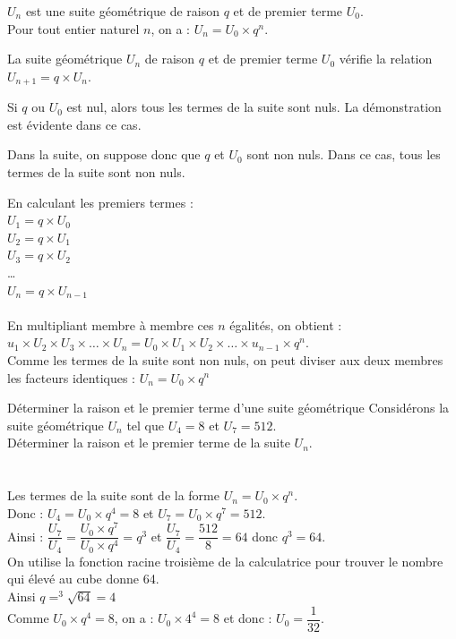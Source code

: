 \begin{propriete}
    $U_n$ est une suite géométrique de raison $q$ et de premier terme $U_0$.\\
    Pour tout entier naturel $n$, on a : $U_n= U_0\times q^n$.
\end{propriete}

\begin{bdemo}
    La suite géométrique $U_n$ de raison $q$ et de premier terme $U_0$ vérifie la relation
    $U_{n+1}=q\times U_n$.
    \begin{itemDem}
    	\item Si $q$ ou $U_0$ est nul, alors tous les termes de la suite sont nuls. La démonstration est évidente dans ce cas.
    	\item Dans la suite, on suppose donc que $q$ et $U_0$ sont non nuls. Dans ce cas, tous les termes de la suite sont non nuls.
    \end{itemDem}
    En calculant les premiers termes :\\ 
    $U_1=q\times U_0$\\
    $U_2=q\times U_1$\\
    $U_3=q\times U_2$\\
    …\\
    $U_n=q\times U_{n-1}$\\
    \\
    En multipliant membre à membre ces $n$ égalités, on obtient :
    $u_1\times U_2\times U_3\times …\times U_n=U_0\times U_1\times U_2\times …\times u_{n-1}\times q^n$.\\
    Comme les termes de la suite sont non nuls, on peut diviser aux deux membres les facteurs identiques : $U_n=U_0\times q^n$
\end{bdemo}

\begin{bmethodet}{Déterminer la raison et le premier terme d'une suite géométrique}
Considérons la suite géométrique $U_n$ tel que $U_4=8$ et $U_7=512$.\\
Déterminer la raison et le premier terme de la suite $U_n$.\\
\\
\ \\
Les termes de la suite sont de la forme $U_n=U_0\times q^n$.\\
Donc : $U_4=U_0\times q^4=8$ et $U_7=U_0\times q^7=512$.\\
Ainsi : $\dfrac{U_7}{U_4}  = \dfrac{U_0\times q^7}{U_0\times q^4}  =q^3$ et $\dfrac{U_7}{U_4}=\dfrac{512}{8}=64$ donc $q^3=64$.\\
On utilise la fonction racine troisième de la calculatrice pour trouver le nombre qui élevé au cube donne 64.\\
Ainsi $q=^3\sqrt{64}=4$\\
Comme $U_0 \times q^4=8$, on a : $U_0\times 4^4=8$ et donc : $U_0= \dfrac{1}{32}$.
\end{bmethodet}

